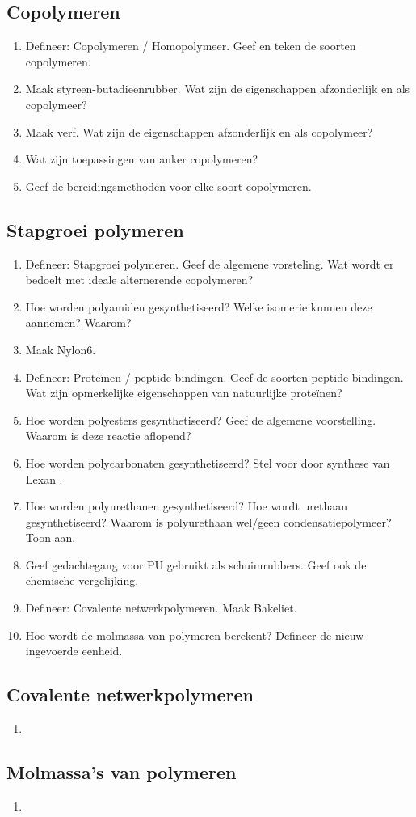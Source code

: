\documentclass[a4paper,12pt]{article}
\begin{document}
    \subsection*{Copolymeren}
    \begin{enumerate}
        \item Defineer: Copolymeren / Homopolymeer. Geef en teken de soorten copolymeren.
        \item Maak styreen-butadieenrubber. Wat zijn de eigenschappen afzonderlijk en als copolymeer?
        \item Maak verf. Wat zijn de eigenschappen afzonderlijk en als copolymeer?
        \item Wat zijn toepassingen van anker copolymeren?
        \item Geef de bereidingsmethoden voor elke soort copolymeren.
    \end{enumerate}
    \subsection*{Stapgroei polymeren}
    \begin{enumerate}
        \item Defineer: Stapgroei polymeren. Geef de algemene vorsteling. Wat wordt er bedoelt met ideale alternerende copolymeren?
        \item Hoe worden polyamiden gesynthetiseerd? Welke isomerie kunnen deze aannemen? Waarom?
        \item Maak Nylon6.
        \item Defineer: Proteïnen / peptide bindingen. Geef de soorten peptide bindingen. Wat zijn opmerkelijke eigenschappen van natuurlijke proteïnen?
        \item Hoe worden polyesters gesynthetiseerd? Geef de algemene voorstelling. Waarom is deze reactie aflopend?
        \item Hoe worden polycarbonaten gesynthetiseerd? Stel voor door synthese van Lexan \textregistered.
        \item Hoe worden polyurethanen gesynthetiseerd? Hoe wordt urethaan gesynthetiseerd? Waarom is polyurethaan wel/geen condensatiepolymeer? Toon aan.
        \item Geef gedachtegang voor PU gebruikt als schuimrubbers. Geef ook de chemische vergelijking.
        \item Defineer: Covalente netwerkpolymeren. Maak Bakeliet.
        \item Hoe wordt de molmassa van polymeren berekent? Defineer de nieuw ingevoerde eenheid.
    \end{enumerate}
    \subsection*{Covalente netwerkpolymeren}
    \begin{enumerate}
        \item 
    \end{enumerate}
    \subsection*{Molmassa's van polymeren}
    \begin{enumerate}
        \item 
    \end{enumerate}
\end{document}
